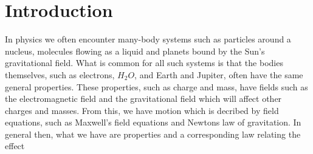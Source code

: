 \section{Introduction}
\label{sec:introduction}

In physics we often encounter many-body systems such as particles around a nucleus,
molecules flowing as a liquid and planets bound by the Sun's gravitational field.
What is common for all such systems is that the bodies themselves, such as
electrons, $H_2 O$, and Earth and Jupiter, often have the same general properties.
These properties, such as charge and mass, have fields such as the electromagnetic field
and the gravitational field which will affect other charges and masses. From this,
we have motion which is decribed by field equations, such as Maxwell's field equations
and Newtons law of gravitation. In general then, what we have are properties and a
corresponding law relating the effect
